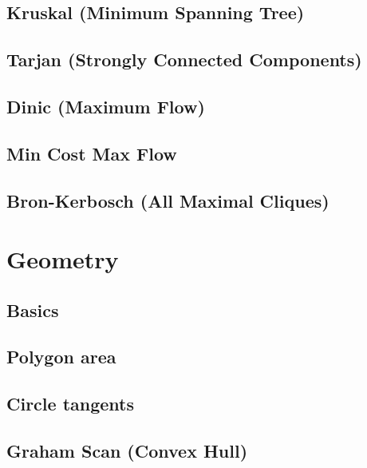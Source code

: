 \documentclass[10pt]{article}
\begin{document}
		\newpage
		\subsection{Kruskal (Minimum Spanning Tree)}
		
		
		\newpage
		\subsection{Tarjan (Strongly Connected Components)}
		
		
		\newpage
		\subsection{Dinic (Maximum Flow)}
		
		
		\newpage
		\subsection{Min Cost Max Flow}
		
		
		\newpage
		\subsection{Bron-Kerbosch (All Maximal Cliques)}
		

	\newpage		
	\section{Geometry}
		\subsection{Basics}
		
		
		\newpage
		\subsection{Polygon area}
		
		
		\subsection{Circle tangents}
		

		\subsection{Graham Scan (Convex Hull)}
		
		
\end{document}
